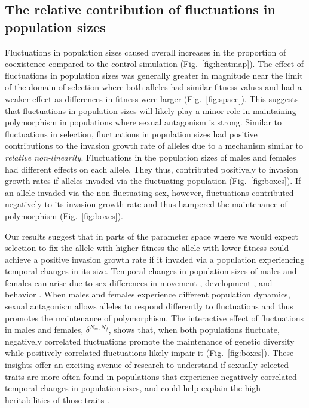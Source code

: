 \begin{refsection}
\subsection*{The relative contribution of fluctuations in population sizes}

 Fluctuations in population sizes caused overall increases in the proportion of coexistence compared to the control simulation  (Fig.~\ref{fig:heatmap}).  The effect of fluctuations in population sizes was generally greater in magnitude near the limit of the domain of selection where both alleles had similar fitness values and had a weaker effect as differences in fitness were larger (Fig.~\ref{fig:space}). This suggests that fluctuations in population sizes will likely play a minor role in maintaining polymorphism in populations where sexual antagonism is strong.  Similar to fluctuations in selection, fluctuations in population sizes had positive contributions to the invasion growth rate of alleles due to a mechanism similar to \textit{relative non-linearity}. Fluctuations in the population sizes of males and females had different effects on each allele. They thus, contributed positively to invasion growth rates if alleles invaded via the fluctuating population (Fig.~\ref{fig:boxes}). If an allele invaded via the non-fluctuating sex, however, fluctuations contributed negatively to its invasion growth rate and thus hampered the maintenance of polymorphism (Fig.~\ref{fig:boxes}).

 Our results suggest that in parts of the parameter space where we would expect selection to fix the allele with higher fitness the allele with lower fitness could achieve a positive invasion growth rate if it invaded via a population experiencing temporal changes in its size.  Temporal changes in population sizes of males and females can arise due to sex differences in movement \citep[e.g., if males immigrate to higher quality areas;][]{matter2002experimental}, development \citep[e.g., females requiring more time to mature than males;][]{kasumovic2008spatial}, and behavior \citep[e.g., cannibalistic mating;][]{elgar2003male}. When males and females experience different population dynamics, sexual antagonism allows alleles to respond differently to fluctuations and thus promotes the maintenance of polymorphism. The interactive effect of fluctuations in males and females, $\delta^{N_{m},N_{f}}$, shows that, when both populations fluctuate, negatively correlated fluctuations promote the maintenance of genetic diversity while positively correlated fluctuations likely impair it  (Fig.~\ref{fig:boxes}). These insights offer an exciting avenue of research to understand if sexually selected traits are more often found in populations that experience negatively correlated temporal changes in population sizes, and could help explain the high heritabilities of those traits \citep{reinhold2000maintenance}.


\end{refsection}
